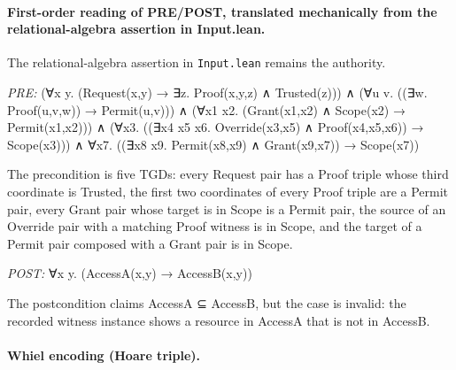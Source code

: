 \documentclass[10pt]{article}
\begin{document}
\paragraph{First-order reading of PRE/POST, translated mechanically from the relational-algebra assertion in Input.lean.} The relational-algebra assertion in \texttt{Input.lean} remains the authority.

\textit{PRE:} (∀x y. (Request(x,y) → ∃z. Proof(x,y,z) ∧ Trusted(z))) ∧ (∀u v. ((∃w. Proof(u,v,w)) → Permit(u,v))) ∧ (∀x1 x2. (Grant(x1,x2) ∧ Scope(x2) → Permit(x1,x2))) ∧ (∀x3. ((∃x4 x5 x6. Override(x3,x5) ∧ Proof(x4,x5,x6)) → Scope(x3))) ∧ ∀x7. ((∃x8 x9. Permit(x8,x9) ∧ Grant(x9,x7)) → Scope(x7))\par The precondition is five TGDs: every Request pair has a Proof triple whose third coordinate is Trusted, the first two coordinates of every Proof triple are a Permit pair, every Grant pair whose target is in Scope is a Permit pair, the source of an Override pair with a matching Proof witness is in Scope, and the target of a Permit pair composed with a Grant pair is in Scope.

\textit{POST:} ∀x y. (AccessA(x,y) → AccessB(x,y))\par The postcondition claims AccessA ⊆ AccessB, but the case is invalid: the recorded witness instance shows a resource in AccessA that is not in AccessB.

\paragraph{Whiel encoding (Hoare triple).}
\end{document}
